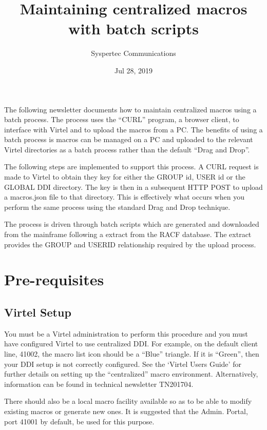 \documentclass[letterpaper,10pt,english]{sphinxmanual}
\title{Maintaining centralized macros with batch scripts}
\date{Jul 28, 2019}
\author{Syspertec Communications}
\begin{document}
\pagestyle{empty}
\sphinxmaketitle
\pagestyle{plain}
\sphinxtableofcontents
\pagestyle{normal}
\label{\detokenize{TN201903::doc}}


The following newsletter documents how to maintain centralized macros using a batch process. The process uses the “CURL” program, a browser client, to interface with Virtel and to upload the macros from a PC. The benefits of using a batch process is macros can be managed on a PC and uploaded to the relevant Virtel directories as a batch process rather than the default “Drag and Drop”.

The following steps are implemented to support this process. A CURL request is made to Virtel to obtain they key for either the GROUP id, USER id or the GLOBAL DDI directory. The key is then in a subsequent HTTP POST to upload a macros.json file to that directory. This is effectively what occurs when you perform the same process using the standard Drag and Drop technique.

The process is driven through batch scripts which are generated and downloaded from the mainframe following a extract from the RACF database. The extract provides the GROUP and USERID relationship required by the upload process.


\chapter{Pre-requisites}
\label{\detokenize{TN201903:pre-requisites}}

\section{Virtel Setup}
\label{\detokenize{TN201903:virtel-setup}}
You must be a Virtel administration to perform this procedure and you must have configured Virtel to use centralized DDI. For example, on the default client line, 41002, the macro list icon should be a “Blue” triangle. If it is “Green”, then your DDI setup is not correctly configured. See the ‘Virtel Users Guide’ for further details on setting up the “centralized” macro environment. Alternatively, information can be found in technical newsletter TN201704.

There should also be a local macro facility available so as to be able to modify existing macros or generate new ones. It is suggested that the Admin. Portal, port 41001 by default, be used for this purpose.
\end{document}
